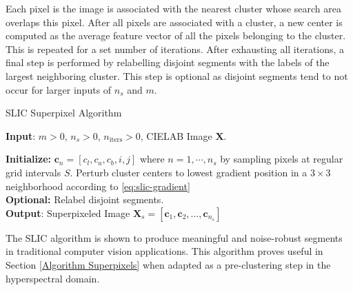 Each pixel is the image is associated with the nearest cluster whose search area overlaps this pixel. After all pixels are associated with a cluster, a new center is computed as the average feature vector of all the pixels belonging to the cluster. This is repeated for a set number of iterations. After exhausting all iterations, a final step is performed by relabelling disjoint segments with the labels of the largest neighboring cluster. This step is optional as disjoint segments tend to not occur for larger inputs of $n_s$ and $m$.

\begin{algorithm}[H]
    \caption{SLIC Superpixel Algorithm}
    \textbf{Input}: $m > 0$, $n_s > 0$, $n_{\text{iters}} > 0$, CIELAB Image $\mathbf{X}$.

    \textbf{Initialize:} $\mathbf{c}_n = [c_{l}, c_{a}, c_{b}, i, j]$ where $n = 1, \cdots, n_s$ by sampling pixels at regular grid intervals $S$. Perturb cluster centers to lowest gradient position in a $3 \times 3$ neighborhood according to \eqref{eq:slic-gradient} \\
    
    \textbf{Optional:} Relabel disjoint segments.\\

    \textbf{Output}: Superpixeled Image $\mathbf{X}_s = [\mathbf{c}_1, \mathbf{c}_2, \dots, \mathbf{c}_{n_s}]$
\end{algorithm}

The SLIC algorithm is shown to produce meaningful and noise-robust segments in traditional computer vision applications. This algorithm proves useful in Section \ref{Algorithm Superpixels} when adapted as a pre-clustering step in the hyperspectral domain.
